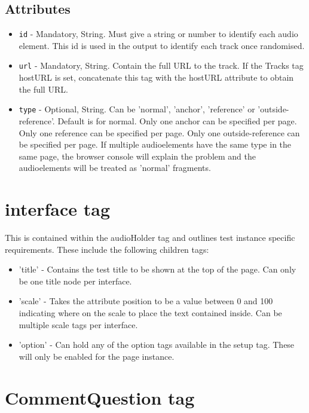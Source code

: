 \documentclass{article}
\begin{document}
\subsection{Attributes}
\begin{itemize}
\item \texttt{id} - Mandatory, String. Must give a string or number to identify each audio element. This id is used in the output to identify each track once randomised.
\item \texttt{url} - Mandatory, String. Contain the full URL to the track. If the Tracks tag hostURL is set, concatenate this tag with the hostURL attribute to obtain the full URL.
\item \texttt{type} - Optional, String. Can be 'normal', 'anchor', 'reference' or 'outside-reference'. Default is for normal. Only one anchor can be specified per page. Only one reference can be specified per page. Only one outside-reference can be specified per page. If multiple audioelements have the same type in the same page, the browser console will explain the problem and the audioelements will be treated as 'normal' fragments.
\end{itemize}

\section{interface tag}

This is contained within the audioHolder tag and outlines test instance specific requirements. These include the following children tags:
\begin{itemize}
\item 'title' - Contains the test title to be shown at the top of the page. Can only be one title node per interface.
\item 'scale' - Takes the attribute position to be a value between 0 and 100 indicating where on the scale to place the text contained inside. Can be multiple scale tags per interface.
\item 'option' - Can hold any of the option tags available in the setup tag. These will only be enabled for the page instance.
\end{itemize}

\section {CommentQuestion tag}
\end{document}
